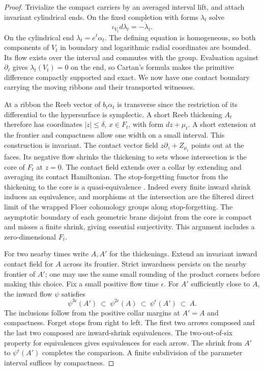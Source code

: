\begin{proof}
Trivialize the compact carriers by an averaged interval lift, and attach invariant cylindrical ends. On the fixed completion with forms $\lambda_t$ solve
\[
                   \iota_{V_t}d\lambda_t=-\dot\lambda_t .
\]
On the cylindrical end $\lambda_t=e^\ell\alpha_t$. The defining equation is homogeneous, so both components of $V_t$ in boundary and logarithmic radial coordinates are bounded. Its flow exists over the interval and commutes with the group. Evaluation against $\partial_\ell$ gives $\lambda_t(V_t)=0$ on the end, so Cartan's formula makes the primitive difference compactly supported and exact. We now have one contact boundary carrying the moving ribbons and their transported witnesses.

At a ribbon the Reeb vector of $b_t\alpha_t$ is transverse since the restriction of its differential to the hypersurface is symplectic. A short Reeb thickening $A_t$ therefore has coordinates $|z|\le\delta$, $x\in F_t$, with form $dz+\mu_t$. A short extension at the frontier and compactness allow one width on a small interval. This construction is invariant. The contact vector field $z\partial_z+Z_{\mu_t}$ points out at the faces. Its negative flow shrinks the thickening to sets whose intersection is the core of $F_t$ at $z=0$. The contact field extends over a collar by extending and averaging its contact Hamiltonian. The stop-forgetting functor from the thickening to the core is a quasi-equivalence \cite[\S3.2, Lemmas~3.5--3.6, Corollary~3.9]{GPS}. Indeed every finite inward shrink induces an equivalence, and morphisms at the intersection are the filtered direct limit of the wrapped Floer cohomology groups along stop-forgetting. The asymptotic boundary of each geometric brane disjoint from the core is compact and misses a finite shrink, giving essential surjectivity. This argument includes a zero-dimensional $F_t$.

For two nearby times write $A,A'$ for the thickenings. Extend an invariant inward contact field for $A$ across its frontier. Strict inwardness persists on the nearby frontier of $A'$; one may use the same small rounding of the product corners before making this choice. Fix a small positive flow time $\epsilon$. For $A'$ sufficiently close to $A$, the inward flow $\psi$ satisfies
\[
     \psi^{3\epsilon}(A')\ \subset\ \psi^{2\epsilon}(A)\
            \subset\ \psi^\epsilon(A')\ \subset\ A .
\]
The inclusions follow from the positive collar margins at $A'=A$ and compactness. Forget stops from right to left. The first two arrows composed and the last two composed are inward-shrink equivalences. The two-out-of-six property for equivalences gives equivalences for each arrow. The shrink from $A'$ to $\psi^\epsilon(A')$ completes the comparison. A finite subdivision of the parameter interval suffices by compactness.


\end{proof}
